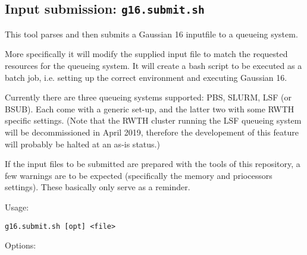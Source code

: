 \documentclass[   %
  final,          %
  a4paper         %
]{article}
\begin{document}
\subsection{Input submission: \texorpdfstring{{\lstinline`g16.submit.sh`}}{g16.submit.sh}}

This tool parses and then submits a Gaussian 16 inputfile to a queueing system.

More specifically it will modify the supplied input file 
to match the requested resources for the queueing system.
It will create a bash script to be executed as a batch job, 
i.e. setting up the correct environment and executing Gaussian 16.

Currently there are three queueing systems supported: PBS, SLURM, LSF (or BSUB).
Each come with a generic set-up, and the latter two with some RWTH specific settings.
(Note that the RWTH cluster running the LSF queueing system will be decommissioned in April 2019,
therefore the developement of this feature will probably be halted at an as-is status.)

If the input files to be submitted are prepared with the tools of this repository,
a few warnings are to be expected (specifically the memory and priocessors settings).
These basically only serve as a reminder.

Usage: 

\lstinline`g16.submit.sh [opt] <file>`

Options:
\end{document}
